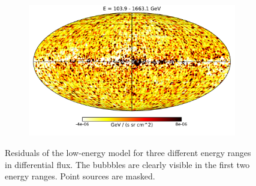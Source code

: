 \begin{figure}[t]
{\begin{subfigure}{0.3\textwidth}
    	\end{subfigure}
    	\begin{subfigure}{0.3\textwidth}
        	\includegraphics[width=\textwidth]{plots/LowE_06-16GeV_smallmask_bubblesexcl_highEsmooth_symmask_tot_highhigh_hot.pdf}
    	\end{subfigure}
    }
  	\caption{Residuals of the low-energy model for three different energy ranges in differential flux. The \Fermi bubbbles are clearly visible in the first two energy ranges. Point sources are masked.}
  	\label{Maps_lowE}
\end{figure}

